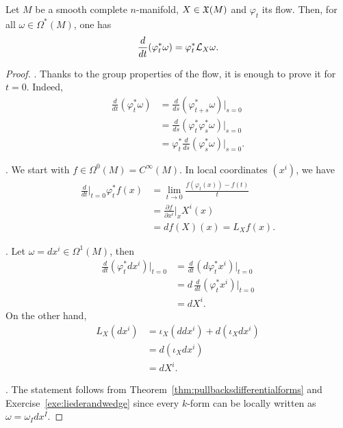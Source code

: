\begin{theorem}\label{thm:LieDerivativeFlow}
  Let $M$ be a smooth complete $n$-manifold, $X\in\mathfrak{X}(M)$ and $\varphi_t$ its flow.
  Then, for all $\omega\in \Omega^*(M)$, one has
  \begin{equation}
    \frac{d}{dt}(\varphi_t^* \omega) = \varphi_t^*\mathcal{L}_X\omega.
  \end{equation}
\end{theorem}
\begin{proof}
  .
  Thanks to the group properties of the flow, it is enough to prove it for $t=0$.
  Indeed,
  \begin{align}
    \frac{d}{dt}(\varphi_t^* \omega)
    &= \frac{d}{ds}(\varphi_{t+s}^* \omega)\Big|_{s=0} \\
    &= \frac{d}{ds}(\varphi_t^*\varphi_s^*\omega)\Big|_{s=0} \\
    &= \varphi^*_t \frac{d}{ds}(\varphi_s^*\omega)\Big|_{s=0}.
  \end{align}

  .
  We start with $f\in\Omega^0(M) = C^\infty(M)$.
  In local coordinates $(x^i)$, we have
  \begin{align}
    \frac{d}{dt}\Big|_{t=0}\varphi_t^* f(x) 
    &= \lim_{t\to0} \frac{f(\varphi_t(x)) - f(t)}{t} \\
    &= \frac{\partial f}{\partial x^i}\Big|_x X^i(x) \\
    &= df(X)(x) = L_X f(x).
  \end{align} 

  . Let $\omega = dx^i \in \Omega^1(M)$, then
  \begin{align}
    \frac{d}{dt}(\varphi_t^* dx^i)\Big|_{t=0}
    &= \frac{d}{dt}(d\varphi_t^* x^i)\Big|_{t=0} \\
    &= d\, \frac{d}{dt}(\varphi_t^* x^i)\Big|_{t=0} \\
    &= dX^i.
  \end{align}
  On the other hand,
  \begin{align}
    L_X(dx^i)
    &= \iota_X(ddx^i) + d(\iota_X dx^i)\\
    &= d(\iota_X dx^i) \\
    &= dX^i.
  \end{align}

  . The statement follows from Theorem~\ref{thm:pullbacksdifferentialforms} and Exercise~\ref{exe:liederandwedge} since every $k$-form can be locally written as $\omega = \omega_I dx^I$.
\end{proof}

